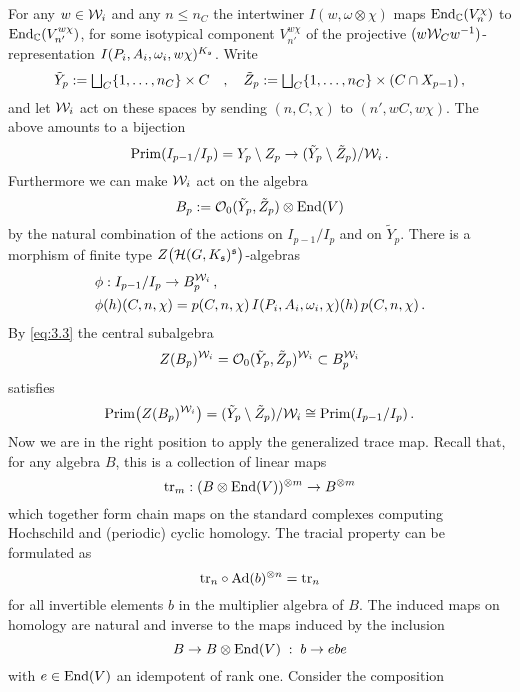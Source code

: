 For any $w \in \mathcal W_i$ and any $n \leq n_C$ the intertwiner $I(w,\omega \otimes \chi)$ maps
$\mathrm{End}_{\mathbb C}(V_n^\chi )$ to $\mathrm{End}_{\mathbb C}(V_{n'}^{w \chi} )$, for some isotypical
component $V_{n'}^{w \chi}$ of the projective $(w \mathcal W_C w^{-1})$-representation 
$I(P_i ,A_i ,\omega_i ,w \chi )^{K_{\mathfrak s}}$. Write 
\[
\tilde Y_p := {\textstyle \bigsqcup_C} \{ 1,\ldots ,n_C \} \times C \quad , \quad 
\tilde Z_p := {\textstyle \bigsqcup_C} \{ 1,\ldots ,n_C \} \times (C \cap X_{p-1}) \,,
\]
and let $\mathcal W_i$ act on these spaces by sending $(n,C, \chi)$ to $(n',w C ,w \chi)$.
The above amounts to a bijection
\begin{equation}\label{eq:3.3}
\mathrm{Prim}(I_{p-1}/I_p ) = Y_p \setminus Z_p \to (\tilde Y_p \setminus \tilde Z_p ) / \mathcal W_i \,.
\end{equation}
Furthermore we can make $\mathcal W_i$ act on the algebra 
\[
B_p := \mathcal O_0 (\tilde Y_p ,\tilde Z_p ) \otimes \mathrm{End}(V)
\]
by the natural combination of the actions on $I_{p-1}/I_p$ and on $\tilde Y_p$. There is a
morphism of finite type $Z \big( \mathcal H (G,K_{\mathfrak s})^{\mathfrak s} \big)$-algebras
\begin{align*}
& \phi : I_{p-1}/I_p \to B_p^{\mathcal W_i} \,, \\
& \phi (h) (C,n,\chi) = p(C,n,\chi ) \, I(P_i ,A_i ,\omega_i ,\chi )(h) \, p(C,n,\chi )\,.
\end{align*}
By \eqref{eq:3.3} the central subalgebra
\[
Z(B_p )^{\mathcal W_i} = \mathcal O_0 (\tilde Y_p ,\tilde Z_p )^{\mathcal W_i} \subset B_p^{\mathcal W_i}
\]
satisfies
\[
\mathrm{Prim} \big( Z(B_p )^{\mathcal W_i} \big) = (\tilde Y_p \setminus \tilde Z_p ) / \mathcal W_i
\cong \mathrm{Prim}(I_{p-1}/I_p ) \,.
\]
Now we are in the right position to apply the generalized trace map. 
Recall \cite[Section 1.2]{Lod} that, for any algebra $B$, this is a collection of linear maps 
\[
\mathrm{tr}_m : (B \otimes \mathrm{End} (V) )^{\otimes m} \to B^{\otimes m}
\]
which together form chain maps on the standard complexes computing Hochschild
and (periodic) cyclic homology. The tracial property can be formulated as
\begin{equation}\label{eq:3.5}
\mathrm{tr}_n \circ \mathrm{Ad}(b)^{\otimes n} = \mathrm{tr}_n
\end{equation}
for all invertible elements $b$ in the multiplier algebra of $B$. The induced maps on 
homology are natural and inverse to the maps induced by the inclusion
\begin{equation}\label{eq:3.11}
B \to B \otimes \mathrm{End}(V) \;:\; b \to e b e
\end{equation}
with $e \in \mathrm{End}(V)$ an idempotent of rank one. Consider the composition 

